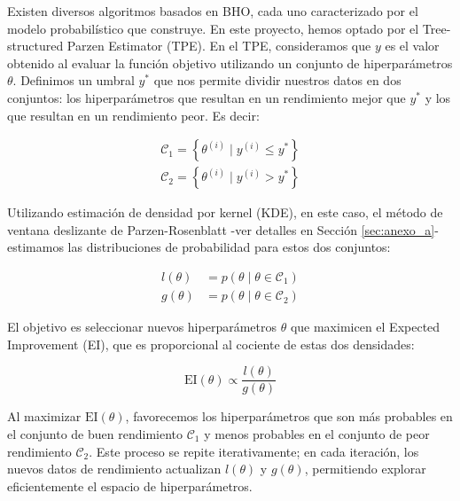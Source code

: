 Existen diversos algoritmos basados en BHO, cada uno caracterizado por el modelo probabilístico que construye. En este proyecto, hemos optado por el Tree-structured Parzen Estimator (TPE). En el TPE, consideramos que \( y \) es el valor obtenido al evaluar la función objetivo utilizando un conjunto de hiperparámetros \( \theta \). Definimos un umbral \( y^* \) que nos permite dividir nuestros datos en dos conjuntos: los hiperparámetros que resultan en un rendimiento mejor que \( y^* \) y los que resultan en un rendimiento peor. Es decir:

\begin{equation}
	\begin{aligned}
		\mathcal{C}_1 = \left\{ \theta^{(i)} \mid y^{(i)} \leq y^* \right\} \\
		\mathcal{C}_2 = \left\{ \theta^{(i)} \mid y^{(i)} > y^* \right\}
	\end{aligned}
\end{equation}

Utilizando estimación de densidad por kernel (KDE), en este caso, el método de ventana deslizante de Parzen-Rosenblatt -ver detalles en Sección \ref{sec:anexo_a}- estimamos las distribuciones de probabilidad para estos dos conjuntos:

\begin{equation}
	\begin{aligned}
		l(\theta) &= p(\theta \mid \theta \in \mathcal{C}_1) \\
		g(\theta) &= p(\theta \mid \theta \in \mathcal{C}_2)
	\end{aligned}
\end{equation}

El objetivo es seleccionar nuevos hiperparámetros \( \theta \) que maximicen el Expected Improvement (EI), que es proporcional al cociente de estas dos densidades:

\begin{equation}
	\mathrm{EI}(\theta) \propto \frac{l(\theta)}{g(\theta)}
\end{equation}

Al maximizar \( \mathrm{EI}(\theta) \), favorecemos los hiperparámetros que son más probables en el conjunto de buen rendimiento \( \mathcal{C}_1 \) y menos probables en el conjunto de peor rendimiento \( \mathcal{C}_2 \). Este proceso se repite iterativamente; en cada iteración, los nuevos datos de rendimiento actualizan \( l(\theta) \) y \( g(\theta) \), permitiendo explorar eficientemente el espacio de hiperparámetros.

